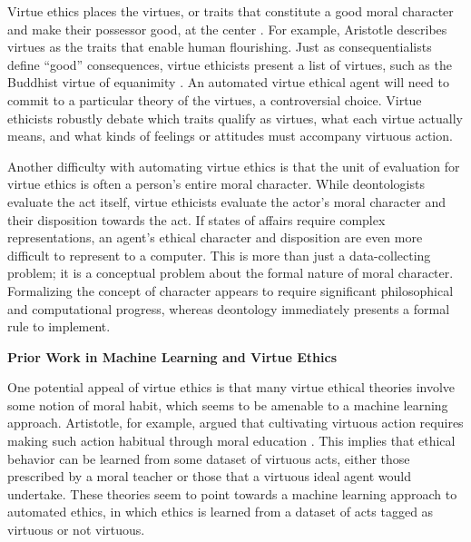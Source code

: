 \begin{isabellebody}
\isadelimdocument
%
\endisadelimdocument
%
\isatagdocument
%
\isamarkuptrue%
%
\endisatagdocument
{\isafolddocument}%
%
\isadelimdocument
%
\endisadelimdocument
%
\begin{isamarkuptext}%
Virtue ethics places the virtues, or traits that constitute a good moral character and make 
their possessor good, at the center \citep{vesep}. For example, Aristotle describes virtues as the 
traits that enable human flourishing. Just as consequentialists define ``good'' consequences, virtue 
ethicists present a list of virtues, such as the Buddhist virtue of equanimity \citep{mcrae}. An automated virtue 
ethical agent will need to commit to a particular theory of the virtues, a controversial choice. 
Virtue ethicists robustly debate which traits qualify as virtues, what each virtue actually means, and 
what kinds of feelings or attitudes must accompany virtuous action.%
\end{isamarkuptext}\isamarkuptrue%
%
\begin{isamarkuptext}%
Another difficulty with automating virtue ethics is that the unit of evaluation for virtue ethics
is often a person's entire moral character. While deontologists evaluate the act itself, virtue ethicists 
evaluate the actor's moral character and their 
disposition towards the act. If states of affairs
require complex representations, an agent's ethical character and disposition are even more difficult
to represent to a computer. This is more than just a data-collecting problem; it is a conceptual problem 
about the formal nature of moral character.
Formalizing the concept of character appears to require significant philosophical and computational
progress, whereas deontology immediately presents a formal rule to implement.%
\end{isamarkuptext}\isamarkuptrue%
%
\begin{isamarkuptext}%
\noindent \textbf{Prior Work in Machine Learning and Virtue Ethics}%
\end{isamarkuptext}\isamarkuptrue%
%
\begin{isamarkuptext}%
One potential appeal of virtue ethics is that many virtue ethical theories involve some notion of 
moral habit, which seems to be amenable to a machine learning approach. Artistotle, for example, argued 
that cultivating virtuous action requires making such action habitual through moral education \citep{aristotle}. This
implies that ethical behavior can be learned from some dataset of virtuous acts, either those 
prescribed by a moral teacher or those that a virtuous ideal agent would undertake. These 
theories seem to point towards a machine learning approach to automated ethics, in which ethics is 
learned from a dataset of acts tagged as virtuous or not virtuous. 


\end{isamarkuptext}
\end{isabellebody}

